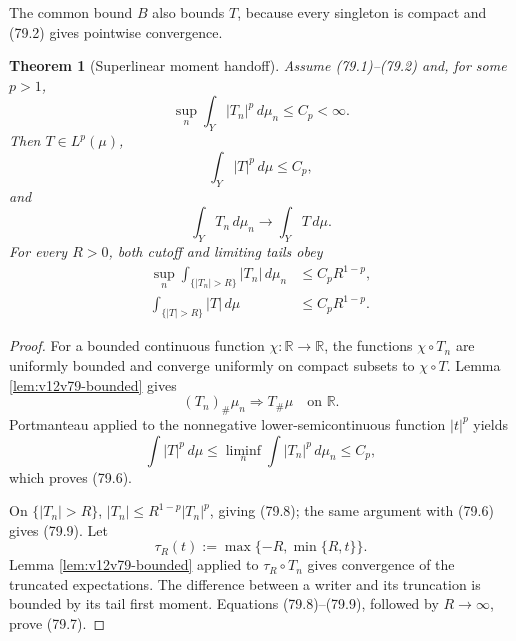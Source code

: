 \documentclass[11pt]{article}
\newtheorem{theorem}{Theorem}[section]
\theoremstyle{remark}
\begin{document}
The common bound \(B\) also bounds \(T\), because every singleton is
compact and (79.2) gives pointwise convergence.

\begin{theorem}[Superlinear moment handoff]
\label{thm:v12v79-moment}
Assume (79.1)--(79.2) and, for some \(p>1\),
\begin{equation}
                         \sup_n\int_Y|T_n|^p\,d\mu_n
                         \leq C_p<\infty.                    \tag{79.5}
\end{equation}
Then \(T\in L^p(\mu)\),
\begin{equation}
                         \int_Y|T|^p\,d\mu\leq C_p,           \tag{79.6}
\end{equation}
and
\begin{equation}
                         \int_YT_n\,d\mu_n
                         \longrightarrow\int_YT\,d\mu.       \tag{79.7}
\end{equation}
For every \(R>0\), both cutoff and limiting tails obey
\begin{align}
 \sup_n\int_{\{|T_n|>R\}}|T_n|\,d\mu_n
 &\leq C_pR^{1-p},                                          \tag{79.8}\\
 \int_{\{|T|>R\}}|T|\,d\mu
 &\leq C_pR^{1-p}.                                          \tag{79.9}
\end{align}
\end{theorem}

\begin{proof}
For a bounded continuous function
\(\chi:\mathbb R\to\mathbb R\), the functions
\(\chi\circ T_n\) are uniformly bounded and converge uniformly on
compact subsets to \(\chi\circ T\).  Lemma
\ref{lem:v12v79-bounded} gives
\[
                    (T_n)_\#\mu_n\Rightarrow T_\#\mu
                    \quad\text{on }\mathbb R.                \tag{79.10}
\]
Portmanteau applied to the nonnegative lower-semicontinuous function
\(|t|^p\) yields
\[
 \int|T|^p\,d\mu
 \leq\liminf_n\int|T_n|^p\,d\mu_n
 \leq C_p,
\]
which proves (79.6).

On \(\{|T_n|>R\}\),
\(|T_n|\leq R^{1-p}|T_n|^p\), giving (79.8); the same argument with
(79.6) gives (79.9).  Let
\[
 \tau_R(t):=\max\{-R,\min\{R,t\}\}.
\]
Lemma \ref{lem:v12v79-bounded} applied to
\(\tau_R\circ T_n\) gives convergence of the truncated expectations.
The difference between a writer and its truncation is bounded by its
tail first moment.  Equations (79.8)--(79.9), followed by
\(R\to\infty\), prove (79.7).
\end{proof}
\end{document}
